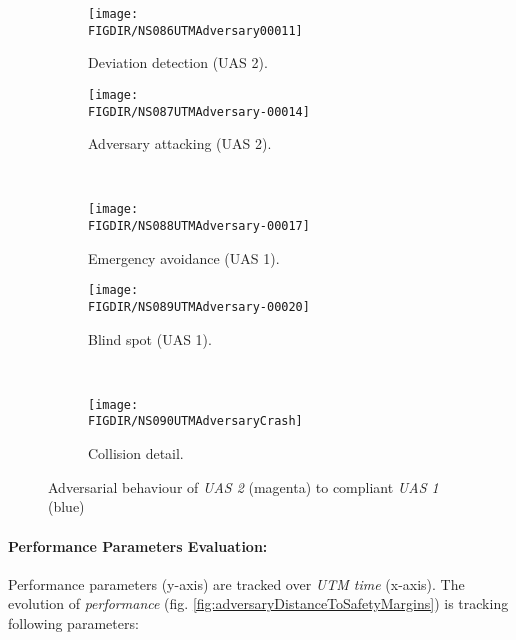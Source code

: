 \begin{figure}[H]
    \centering
    \begin{subfigure}{0.48\textwidth}
    	\centering
        \texttt{[image: \\FIGDIR/NS086UTMAdversary00011]}
        \caption{Deviation detection (UAS 2).}
        \label{fig:adversaryDetectedDeviation}
    \end{subfigure}
    \begin{subfigure}{0.48\textwidth}
    	\centering
        \texttt{[image: \\FIGDIR/NS087UTMAdversary-00014]} 
        \caption{Adversary attacking (UAS 2).}
        \label{fig:adversaryAttacking}
    \end{subfigure}
    \\
    \begin{subfigure}{0.48\textwidth}
    	\centering
        \texttt{[image: \\FIGDIR/NS088UTMAdversary-00017]} 
        \caption{Emergency avoidance (UAS 1).}
        \label{fig:adversaryEmergencyAvoidance}
    \end{subfigure}
    \begin{subfigure}{0.48\textwidth}
    	\centering
        \texttt{[image: \\FIGDIR/NS089UTMAdversary-00020]} 
        \caption{Blind spot (UAS 1).}
        \label{fig:adversaryBlindSpot}
    \end{subfigure}
    \\
    \begin{subfigure}{0.40\textwidth}
    	\centering
        \texttt{[image: \\FIGDIR/NS090UTMAdversaryCrash]} 
        \caption{Collision detail.}
        \label{fig:adversaryCollisionDetail}
    \end{subfigure}
    \caption{Adversarial behaviour of \emph{UAS 2} (magenta) to compliant \emph{UAS 1} (blue)}
    \label{fig:adversarialAttackNotableMoments}
\end{figure}

\paragraph{Performance Parameters Evaluation:} Performance parameters (y-axis) are tracked over \emph{UTM time} (x-axis). The evolution of \emph{performance} (fig. \ref{fig:adversaryDistanceToSafetyMargins}) is tracking following parameters:

